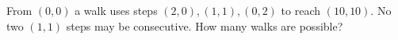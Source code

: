 From $(0,0)$ a walk uses steps $(2,0),(1,1),(0,2)$ to reach $(10,10)$. No two $(1,1)$ steps may be consecutive. How many walks are possible?

